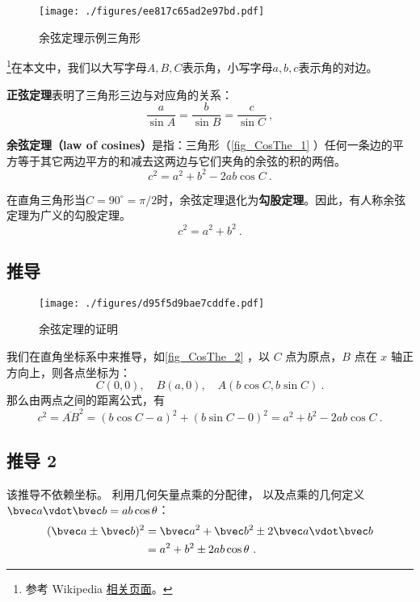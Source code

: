 
\begin{figure}[ht]
\centering
\texttt{[image: ./figures/ee817c65ad2e97bd.pdf]}
\caption{余弦定理示例三角形} \label{fig_CosThe_1}
\end{figure}

\footnote{参考 Wikipedia \href{https://en.wikipedia.org/wiki/Law_of_cosines}{相关页面}。}在本文中，我们以大写字母$A, B, C$表示角，小写字母$a, b, c$表示角的对边。

\textbf{正弦定理}表明了三角形三边与对应角的关系：
\begin{equation}
\frac{a}{\sin A} = \frac{b}{\sin B} = \frac{c}{\sin C} ~,
\end{equation}

\textbf{余弦定理（law of cosines）}是指：三角形（\autoref{fig_CosThe_1} ）任何一条边的平方等于其它两边平方的和减去这两边与它们夹角的余弦的积的两倍。
\begin{equation}\label{eq_CosThe_1}
c^2=a^2 + b^2 - 2ab\cos C~.
\end{equation}

在直角三角形当$C=90^\circ = \pi / 2$时，余弦定理退化为\textbf{勾股定理}。因此，有人称余弦定理为广义的勾股定理。
\begin{equation}
c^2 = a^2 + b^2~.
\end{equation}

\subsection{推导}
\begin{figure}[ht]
\centering
\texttt{[image: ./figures/d95f5d9bae7cddfe.pdf]}
\caption{余弦定理的证明} \label{fig_CosThe_2}
\end{figure}
我们在直角坐标系中来推导，如\autoref{fig_CosThe_2} ，以 $C$ 点为原点，$B$ 点在 $x$ 轴正方向上，则各点坐标为：
\begin{equation}
C(0,0),\quad B(a,0),\quad A(b\cos C,b\sin C)~.
\end{equation}
那么由两点之间的距离公式，有
\begin{equation}
c^2=\overline{AB}^2=(b\cos C-a)^2+(b\sin C-0)^2=a^2+b^2-2ab\cos C~.
\end{equation}

\subsection{推导 2}
该推导不依赖坐标。 利用几何矢量点乘的分配律， 以及点乘的几何定义 $\bvec a \vdot \bvec b = ab\cos\theta$：
\begin{equation}\label{eq_CosThe_2}
\begin{aligned}
(\bvec a \pm \bvec b)^2 &= \bvec a^2 + \bvec b^2 \pm 2\bvec a \vdot \bvec b\\
&= a^2 + b^2 \pm 2ab \cos\theta~.
\end{aligned}
\end{equation}
